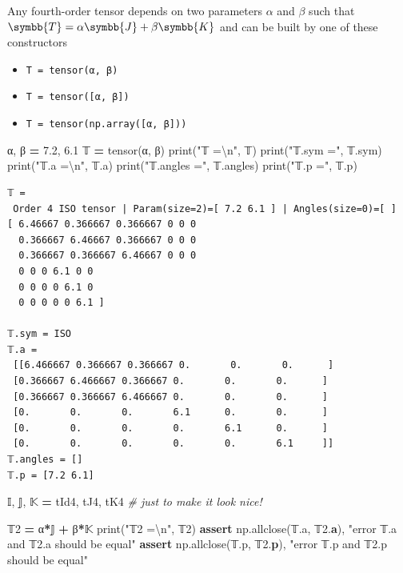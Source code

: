 \documentclass[
  a4paper,
  numbers=noendperiod,
  DIV=12]{scrreprt}
\newenvironment{Shaded}{\begin{snugshade}}{\end{snugshade}}
\newcommand{\BuiltInTok}[1]{#1}
\newcommand{\CharTok}[1]{\textcolor[rgb]{0.31,0.60,0.02}{#1}}
\newcommand{\CommentTok}[1]{\textcolor[rgb]{0.56,0.35,0.01}{\textit{#1}}}
\newcommand{\ControlFlowTok}[1]{\textcolor[rgb]{0.13,0.29,0.53}{\textbf{#1}}}
\newcommand{\DecValTok}[1]{\textcolor[rgb]{0.00,0.00,0.81}{#1}}
\newcommand{\ErrorTok}[1]{\textcolor[rgb]{0.64,0.00,0.00}{\textbf{#1}}}
\newcommand{\FloatTok}[1]{\textcolor[rgb]{0.00,0.00,0.81}{#1}}
\newcommand{\NormalTok}[1]{#1}
\newcommand{\OperatorTok}[1]{\textcolor[rgb]{0.81,0.36,0.00}{\textbf{#1}}}
\newcommand{\StringTok}[1]{\textcolor[rgb]{0.31,0.60,0.02}{#1}}
\providecommand{\tightlist}{%
  \setlength{\itemsep}{0pt}\setlength{\parskip}{0pt}}\usepackage{longtable,booktabs,array}
\newcommand{\uuuu}[1]{{\symbb{{#1}}}}
\begin{document}
Any fourth-order tensor depends on two parameters \(\alpha\) and
\(\beta\) such that \(\uuuu{T}=\alpha \uuuu{J} + \beta \uuuu{K}\) and
can be built by one of these constructors

\begin{itemize}
\tightlist
\item
  \texttt{T\ =\ tensor(α,\ β)}
\item
  \texttt{T\ =\ tensor({[}α,\ β{]})}
\item
  \texttt{T\ =\ tensor(np.array({[}α,\ β{]}))}
\end{itemize}

\begin{Shaded}
\begin{Highlighting}[]
\NormalTok{α, β }\OperatorTok{=} \FloatTok{7.2}\NormalTok{, }\FloatTok{6.1}
\NormalTok{𝕋 }\OperatorTok{=}\NormalTok{ tensor(α, β)}
\BuiltInTok{print}\NormalTok{(}\StringTok{"𝕋 =}\CharTok{\textbackslash{}n}\StringTok{"}\NormalTok{, 𝕋)}
\BuiltInTok{print}\NormalTok{(}\StringTok{"𝕋.sym ="}\NormalTok{, 𝕋.sym)}
\BuiltInTok{print}\NormalTok{(}\StringTok{"𝕋.a =}\CharTok{\textbackslash{}n}\StringTok{"}\NormalTok{, 𝕋.a)}
\BuiltInTok{print}\NormalTok{(}\StringTok{"𝕋.angles ="}\NormalTok{, 𝕋.angles)}
\BuiltInTok{print}\NormalTok{(}\StringTok{"𝕋.p ="}\NormalTok{, 𝕋.p)}
\end{Highlighting}
\end{Shaded}

\begin{verbatim}
𝕋 =
 Order 4 ISO tensor | Param(size=2)=[ 7.2 6.1 ] | Angles(size=0)=[ ]
[ 6.46667 0.366667 0.366667 0 0 0 
  0.366667 6.46667 0.366667 0 0 0 
  0.366667 0.366667 6.46667 0 0 0 
  0 0 0 6.1 0 0 
  0 0 0 0 6.1 0 
  0 0 0 0 0 6.1 ]

𝕋.sym = ISO
𝕋.a =
 [[6.466667 0.366667 0.366667 0.       0.       0.      ]
 [0.366667 6.466667 0.366667 0.       0.       0.      ]
 [0.366667 0.366667 6.466667 0.       0.       0.      ]
 [0.       0.       0.       6.1      0.       0.      ]
 [0.       0.       0.       0.       6.1      0.      ]
 [0.       0.       0.       0.       0.       6.1     ]]
𝕋.angles = []
𝕋.p = [7.2 6.1]
\end{verbatim}

\begin{Shaded}
\begin{Highlighting}[]
\NormalTok{𝕀, 𝕁, 𝕂 }\OperatorTok{=}\NormalTok{ tId4, tJ4, tK4 }\CommentTok{\# just to make it look nice!}

\NormalTok{𝕋}\DecValTok{2} \OperatorTok{=}\NormalTok{ α}\OperatorTok{*}\NormalTok{𝕁 }\OperatorTok{+}\NormalTok{ β}\OperatorTok{*}\NormalTok{𝕂}
\BuiltInTok{print}\NormalTok{(}\StringTok{"𝕋2 =}\CharTok{\textbackslash{}n}\StringTok{"}\NormalTok{, 𝕋}\DecValTok{2}\NormalTok{)}
\ControlFlowTok{assert}\NormalTok{ np.allclose(𝕋.a, 𝕋}\FloatTok{2.}\ErrorTok{a}\NormalTok{), }\StringTok{"error 𝕋.a and 𝕋2.a should be equal"}
\ControlFlowTok{assert}\NormalTok{ np.allclose(𝕋.p, 𝕋}\FloatTok{2.}\ErrorTok{p}\NormalTok{), }\StringTok{"error 𝕋.p and 𝕋2.p should be equal"}
\end{Highlighting}
\end{Shaded}
\end{document}
